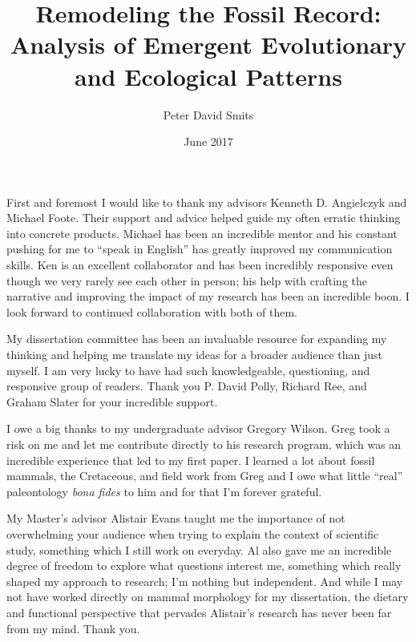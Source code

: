 \documentclass{ucetd}  %
\title{Remodeling the Fossil Record: \protect\\Analysis of Emergent Evolutionary and Ecological Patterns}
\author{Peter David Smits}
\date{June 2017}
\begin{document}
\maketitle

\makecopyright
\makededication


\tableofcontents
\listoffigures
\listoftables

\acknowledgments
First and foremost I would like to thank my advisors Kenneth D. Angielczyk and Michael Foote. Their support and advice helped guide my often erratic thinking into concrete products. Michael has been an incredible mentor and his constant pushing for me to ``speak in English'' has greatly improved my communication skills. Ken is an excellent collaborator and has been incredibly responsive even though we very rarely see each other in person; his help with crafting the narrative and improving the impact of my research has been an incredible boon. I look forward to continued collaboration with both of them.

My dissertation committee has been an invaluable resource for expanding my thinking and helping me translate my ideas for a broader audience than just myself. I am very lucky to have had such knowledgeable, questioning, and responsive group of readers. Thank you P. David Polly, Richard Ree, and Graham Slater for your incredible support. 

I owe a big thanks to my undergraduate advisor Gregory Wilson. Greg took a risk on me and let me contribute directly to his research program, which was an incredible experience that led to my first paper. I learned a lot about fossil mammals, the Cretaceous, and field work from Greg and I owe what little ``real'' paleontology \textit{bona fides} to him and for that I'm forever grateful. 

My Master's advisor Alistair Evans taught me the importance of not overwhelming your audience when trying to explain the context of scientific study, something which I still work on everyday. Al also gave me an incredible degree of freedom to explore what questions interest me, something which really shaped my approach to research; I'm nothing but independent. And while I may not have worked directly on mammal morphology for my dissertation, the dietary and functional perspective that pervades Alistair's research has never been far from my mind. Thank you.
\end{document}
